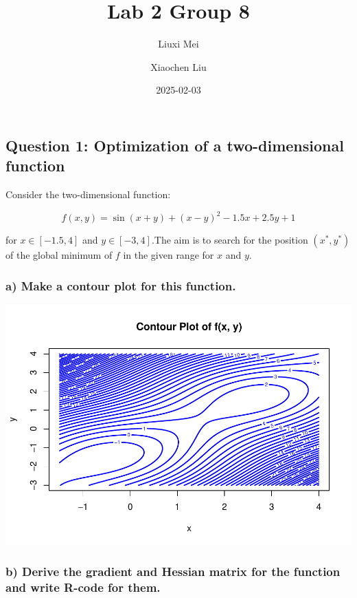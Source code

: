 \documentclass[
]{article}
\title{Lab 2 Group 8}
\author{Liuxi Mei \and Xiaochen Liu}
\date{2025-02-03}
\begin{document}
\maketitle

\subsection{Question 1: Optimization of a two-dimensional
function}\label{question-1-optimization-of-a-two-dimensional-function}

Consider the two-dimensional function:

\[f(x, y) = \sin(x + y) + (x - y)^2 - 1.5x + 2.5y + 1\]

for \(x \in [-1.5, 4]\) and \(y \in [-3, 4]\).The aim is to search for
the position \((x^*, y^*)\) of the global minimum of \(f\) in the given
range for \(x\) and \(y\).

\subsubsection{a) Make a contour plot for this
function.}\label{a-make-a-contour-plot-for-this-function.}

\includegraphics{732A89_lab2_files/figure-latex/unnamed-chunk-1-1.pdf}

\subsubsection{b) Derive the gradient and Hessian matrix for the
function and write R-code for
them.}\label{b-derive-the-gradient-and-hessian-matrix-for-the-function-and-write-r-code-for-them.}
\end{document}
